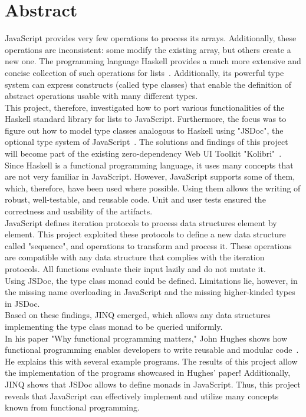 \chapter*{Abstract}
JavaScript provides very few operations to process its arrays.
Additionally, these operations are inconsistent: some modify the existing
array, but others create a new one. The programming language Haskell provides a
much more extensive and concise collection of such operations for
lists~\cite{haskell_list}. Additionally, its powerful type system can express
constructs (called type classes) that enable the definition of abstract
operations usable with many different types.\\ 
This project, therefore, investigated how to port various functionalities of
the Haskell standard library for lists to JavaScript. Furthermore, the focus
was to figure out how to model type classes analogous to Haskell using "JSDoc",
the optional type system of JavaScript~\cite{jsdoc_use_2023}. The solutions and
findings of this project will become part of the existing zero-dependency Web
UI Toolkit "Kolibri"~\cite{kolibri}. \\
Since Haskell is a functional programming language, it uses many concepts that
are not very familiar in JavaScript. However, JavaScript supports some of them,
which, therefore, have been used where possible. Using them allows the writing
of robust, well-testable, and reusable code. Unit and user tests ensured the
correctness and usability of the artifacts. \\
JavaScript defines iteration protocols to process data structures element by
element. This project exploited these protocols to define a new data structure
called "sequence", and operations to transform and process it. These operations
are compatible with any data structure that complies with the iteration
protocols. All functions evaluate their input lazily and do not mutate it.\\
Using JSDoc, the type class monad could be defined. Limitations lie, however,
in the missing name overloading in JavaScript and the missing higher-kinded
types in JSDoc.\\
Based on these findings, JINQ emerged, which allows any data structures
implementing the type class monad to be queried uniformly.\\
In his paper "Why functional programming matters," John Hughes shows how
functional programming enables developers to write reusable and modular
code~\cite{hughes_why_1989}. He explains this with several example programs.
The results of this project allow the implementation of the programs showcased
in Hughes' paper! Additionally, JINQ shows that JSDoc allows to define
monads in JavaScript. Thus, this project reveals that JavaScript can
effectively implement and utilize many concepts known from functional
programming.
